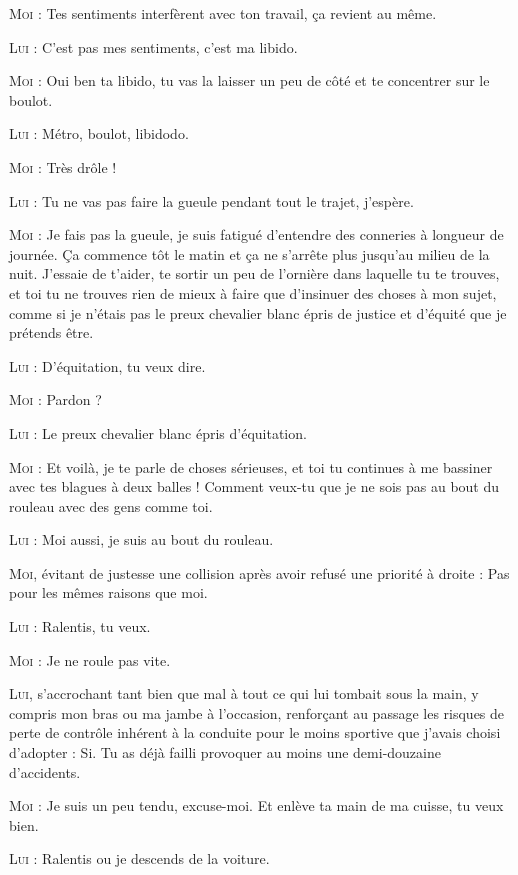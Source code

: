\begin{dialogue}
\textsc{Moi} : Tes sentiments interfèrent avec ton travail, ça revient au même.

\textsc{Lui} : C’est pas mes sentiments, c’est ma libido.

\textsc{Moi} : Oui ben ta libido, tu vas la laisser un peu de côté et te concentrer sur le boulot.

\textsc{Lui} : Métro, boulot, libidodo.

\textsc{Moi} : Très drôle !

\textsc{Lui} : Tu ne vas pas faire la gueule pendant tout le trajet, j’espère.

\textsc{Moi} : Je fais pas la gueule, je suis fatigué d’entendre des conneries à longueur de journée. Ça commence tôt le matin et ça ne s’arrête plus jusqu’au milieu de la nuit. J’essaie de t’aider, te sortir un peu de l’ornière dans laquelle tu te trouves, et toi tu ne trouves rien de mieux à faire que d’insinuer des choses à mon sujet, comme si je n’étais pas le preux chevalier blanc épris de justice et d’équité que je prétends être.

\textsc{Lui} : D’équitation, tu veux dire.

\textsc{Moi} : Pardon ?

\textsc{Lui} : Le preux chevalier blanc épris d’équitation.

\textsc{Moi} : Et voilà, je te parle de choses sérieuses, et toi tu continues à me bassiner avec tes blagues à deux balles ! Comment veux-tu que je ne sois pas au bout du rouleau avec des gens comme toi.

\textsc{Lui} : Moi aussi, je suis au bout du rouleau.

\textsc{Moi}, évitant de justesse une collision après avoir refusé une priorité à droite : Pas pour les mêmes raisons que moi.

\textsc{Lui} : Ralentis, tu veux.

\textsc{Moi} : Je ne roule pas vite.

\textsc{Lui}, s’accrochant tant bien que mal à tout ce qui lui tombait sous la main, y compris mon bras ou ma jambe à l’occasion, renforçant au passage les risques de perte de contrôle inhérent à la conduite pour le moins sportive que j’avais choisi d’adopter : Si. Tu as déjà failli provoquer au moins une demi-douzaine d’accidents.

\textsc{Moi} : Je suis un peu tendu, excuse-moi. Et enlève ta main de ma cuisse, tu veux bien.

\textsc{Lui} : Ralentis ou je descends de la voiture.


\end{dialogue}
